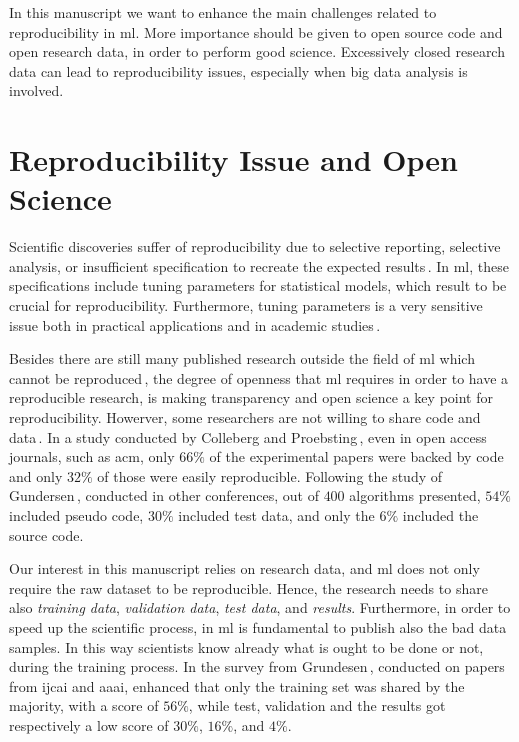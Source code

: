 In this manuscript we want to enhance the main challenges related to reproducibility
in \ac{ml}. More importance should be given to open source
code and open research data, in order to perform good science.
Excessively closed research data can lead to reproducibility issues,
especially when big data analysis is involved.

\section{Reproducibility Issue and Open Science}
Scientific discoveries suffer of reproducibility due
to selective reporting, selective analysis, or insufficient specification to recreate the
expected results\,\cite{aarts2016reproducibility}. 
In \ac{ml}, these specifications include tuning parameters for statistical models, 
which result to be crucial for reproducibility. Furthermore, tuning parameters
is a very sensitive issue both in practical applications and in academic studies\,\cite{birattari2004problem}.

Besides there are still many published research outside the field of \ac{ml} which cannot be
reproduced\,\cite{begley2012drug, begley2015reproducibility, prinz2011believe},
the degree of openness that \ac{ml} requires in order to have a reproducible research, is making
transparency and open science a key point for reproducibility.
Howerver, some researchers are not willing to share code and data\,\cite{gundersen2018state}.
In a study conducted by Colleberg and Proebsting\,\cite{Collberg:2016:RCS:2897191.2812803},
even in open access journals, such as \ac{acm}, only $66\%$ of the experimental papers
were backed by code and only $32\%$ of those were easily reproducible.
Following the study of Gundersen\,\cite{gundersen2018state},
conducted in other conferences, out of $400$ algorithms presented,
$54\%$ included pseudo code, $30\%$ included test data, and only the $6\%$
included the source code.

Our interest in this manuscript relies on research data, and \ac{ml} does not only require the raw dataset
to be reproducible.
Hence, the research needs to share also \emph{training data}, \emph{validation data},
\emph{test data}, and \emph{results}. Furthermore, in order to speed up the scientific process,
in \ac{ml} is fundamental to publish also the bad data samples. In this way scientists know already what is
ought to be done or not, during the training process. In the survey from
Grundesen\,\cite{gundersen2018state}, conducted on papers from \ac{ijcai} and \ac{aaai}, enhanced that
only the training set was shared by the majority, with a score of $56\%$, while test, validation and the results
got respectively a low score of $30\%$, $16\%$, and $4\%$.

